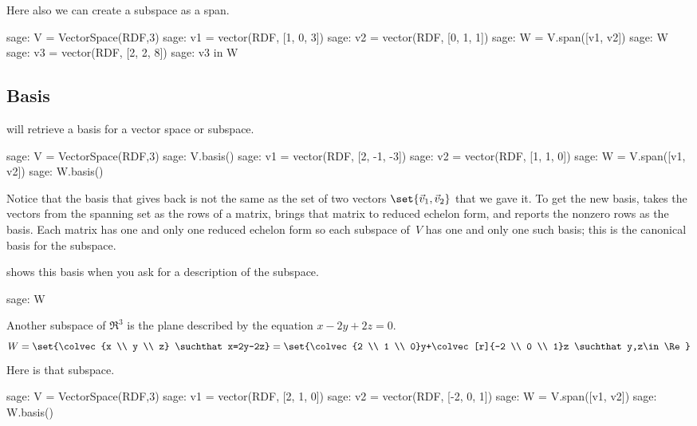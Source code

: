 Here also we can create a subspace as a span.
\begin{sagecommandline}
sage: V = VectorSpace(RDF,3)
sage: v1 = vector(RDF, [1, 0, 3])
sage: v2 = vector(RDF, [0, 1, 1])
sage: W = V.span([v1, v2])
sage: W
sage: v3 = vector(RDF, [2, 2, 8])
sage: v3 in W
\end{sagecommandline}



\subsection{Basis}
\Sage{} will retrieve a basis for a vector space or subspace.
\begin{sagecommandline}
sage: V = VectorSpace(RDF,3)
sage: V.basis()
sage: v1 = vector(RDF, [2, -1, -3])
sage: v2 = vector(RDF, [1, 1, 0])
sage: W = V.span([v1, v2])     
sage: W.basis()
\end{sagecommandline}
Notice that the basis that \Sage{} gives  
back is not the same as the set
of two vectors $\set{\vec{v}_1, \vec{v}_2}$ that we gave it.
To get the new basis, \Sage{} takes the vectors from the spanning set 
as the rows of a matrix,
brings that matrix to reduced echelon form, and reports the nonzero 
rows as the basis.
Each matrix has one and only one reduced echelon form so each 
subspace of~$V$ has one and only one such basis;
this is the canonical basis for the subspace.

\Sage{} shows this basis when you ask for a description
of the subspace.
\begin{sagecommandline}
sage: W  
\end{sagecommandline}

Another subspace of $\Re^3$ is the plane described by the equation
$x-2y+2z=0$.
\begin{equation*}
  W=\set{\colvec{x \\ y \\ z}
    \suchthat x=2y-2z}
  =\set{\colvec{2 \\ 1 \\ 0}y+\colvec[r]{-2 \\ 0 \\ 1}z
        \suchthat y,z\in\Re}
\end{equation*}
Here is that subspace.
\begin{sagecommandline}
sage: V = VectorSpace(RDF,3)               
sage: v1 = vector(RDF, [2, 1, 0]) 
sage: v2 = vector(RDF, [-2, 0, 1]) 
sage: W = V.span([v1, v2])       
sage: W.basis()
\end{sagecommandline}

